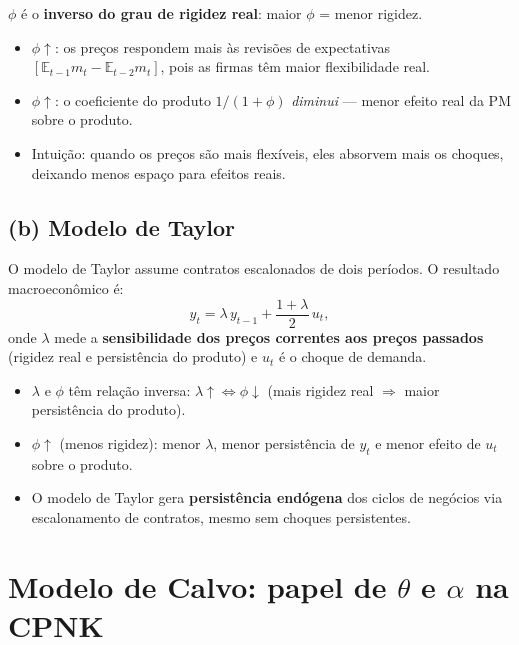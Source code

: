 \documentclass[12pt, a4paper]{article}
\newcommand{\E}{\mathbb{E}}
\begin{document}
\begin{resultbox}[title={Papel de $\phi$ no modelo de Fischer}]
$\phi$ é o \textbf{inverso do grau de rigidez real}: maior $\phi$ = menor rigidez.
\begin{itemize}[leftmargin=1.5em, itemsep=2pt]
  \item $\phi \uparrow$: os preços respondem mais às revisões de expectativas
    $[\E_{t-1}m_t - \E_{t-2}m_t]$, pois as firmas têm maior flexibilidade real.
  \item $\phi \uparrow$: o coeficiente do produto $1/(1+\phi)$ \emph{diminui} --- menor
    efeito real da PM sobre o produto.
  \item Intuição: quando os preços são mais flexíveis, eles absorvem mais os choques,
    deixando menos espaço para efeitos reais.
\end{itemize}
\end{resultbox}

\subsection*{(b) Modelo de Taylor}

O modelo de Taylor assume contratos escalonados de dois períodos. O resultado
macroeconômico é:
\[
y_t = \lambda\,y_{t-1} + \frac{1+\lambda}{2}\,u_t,
\]
onde $\lambda$ mede a \textbf{sensibilidade dos preços correntes aos preços passados}
(rigidez real e persistência do produto) e $u_t$ é o choque de demanda.

\begin{resultbox}[title={Papel de $\lambda$ e $\phi$ no modelo de Taylor}]
\begin{itemize}[leftmargin=1.5em, itemsep=2pt]
  \item $\lambda$ e $\phi$ têm relação inversa: $\lambda \uparrow \Leftrightarrow \phi \downarrow$
    (mais rigidez real $\Rightarrow$ maior persistência do produto).
  \item $\phi \uparrow$ (menos rigidez): menor $\lambda$, menor persistência de $y_t$
    e menor efeito de $u_t$ sobre o produto.
  \item O modelo de Taylor gera \textbf{persistência endógena} dos ciclos de negócios
    via escalonamento de contratos, mesmo sem choques persistentes.
\end{itemize}
\end{resultbox}

\section{Modelo de Calvo: papel de $\theta$ e $\alpha$ na CPNK}
\end{document}
